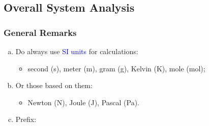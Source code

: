 \documentclass[10pt,compress]{beamer}
\begin{document}
\subsection{Overall System Analysis}

\begin{frame}
 \frametitle{General Remarks}
  \begin{enumerate}[(a)]
   \item <1-> Do always use \textcolor{blue}{SI units} for calculations:
     \begin{itemize}
       \item<1-> second (s), meter (m), gram (g), Kelvin (K), mole (mol);
     \end{itemize}
   \item<2-> Or those based on them:
     \begin{itemize}
       \item<2-> Newton (N), Joule (J), Pascal (Pa).
     \end{itemize}
   \item<3-> Prefix: 
  \end{enumerate}
\end{frame}
\end{document}

